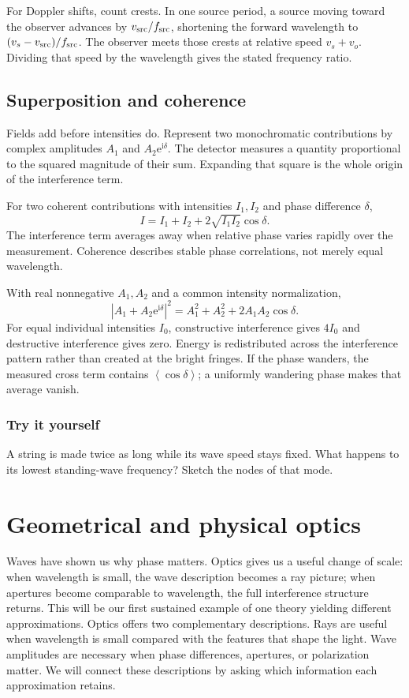 \documentclass[11pt,oneside]{book}
\newcommand{\ii}{\mathrm{i}}
\newcommand{\ee}{\mathrm{e}}
\newcommand{\avg}[1]{\left\langle #1\right\rangle}
\theoremstyle{reviewstyle}
\newcommand{\learningcheck}[1]{\subsection*{Try it yourself}\noindent #1\par}
\begin{document}
For Doppler shifts, count crests. In one source period, a source moving toward the observer advances by $v_{\rm src}/f_{\rm src}$, shortening the forward wavelength to $(v_s-v_{\rm src})/f_{\rm src}$. The observer meets those crests at relative speed $v_s+v_o$. Dividing that speed by the wavelength gives the stated frequency ratio.

\section{Superposition and coherence}
Fields add before intensities do. Represent two monochromatic contributions by complex amplitudes $A_1$ and $A_2\ee^{\ii\delta}$. The detector measures a quantity proportional to the squared magnitude of their sum. Expanding that square is the whole origin of the interference term.

For two coherent contributions with intensities $I_1,I_2$ and phase difference $\delta$,
\begin{equation}I=I_1+I_2+2\sqrt{I_1I_2}\cos\delta.\end{equation}
The interference term averages away when relative phase varies rapidly over the measurement. Coherence describes stable phase correlations, not merely equal wavelength.

With real nonnegative $A_1,A_2$ and a common intensity normalization,
\begin{equation}
|A_1+A_2\ee^{\ii\delta}|^2=A_1^2+A_2^2+2A_1A_2\cos\delta.
\end{equation}
For equal individual intensities $I_0$, constructive interference gives $4I_0$ and destructive interference gives zero. Energy is redistributed across the interference pattern rather than created at the bright fringes. If the phase wanders, the measured cross term contains $\avg{\cos\delta}$; a uniformly wandering phase makes that average vanish.

\learningcheck{A string is made twice as long while its wave speed stays fixed. What happens to its lowest standing-wave frequency? Sketch the nodes of that mode.}

\chapter{Geometrical and physical optics}
Waves have shown us why phase matters. Optics gives us a useful change of scale: when wavelength is small, the wave description becomes a ray picture; when apertures become comparable to wavelength, the full interference structure returns. This will be our first sustained example of one theory yielding different approximations.
Optics offers two complementary descriptions. Rays are useful when wavelength is small compared with the features that shape the light. Wave amplitudes are necessary when phase differences, apertures, or polarization matter. We will connect these descriptions by asking which information each approximation retains.
\end{document}

